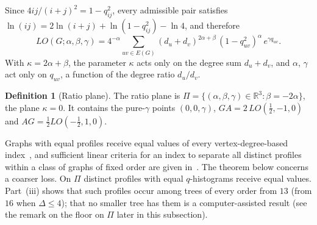 \documentclass[a5paper, 10pt]{article}
\theoremstyle{plain}
\theoremstyle{remark}
\theoremstyle{definition}
\newtheorem{definition}{Definition}
\begin{document}
  Since $4ij/(i+j)^2 = 1 - q_{ij}^2$, every admissible pair satisfies
  $\ln(ij) = 2\ln(i+j) + \ln(1 - q_{ij}^2) - \ln 4$, and therefore
  \begin{equation}\label{eq:factor}
  LO(G;\alpha,\beta,\gamma) = 4^{-\alpha} \sum_{uv \in E(G)}
  (d_u + d_v)^{2\alpha+\beta}\,(1 - q_{uv}^2)^{\alpha}\, e^{\gamma q_{uv}}.
  \end{equation}
  With $\kappa = 2\alpha + \beta$, the parameter $\kappa$ acts only on
  the degree sum $d_u + d_v$, and $\alpha$, $\gamma$ act only on
  $q_{uv}$, a function of the degree ratio $d_u/d_v$.

  \begin{definition}[Ratio plane]\label{def:ratioplane}
  The ratio plane is
  $\Pi = \{(\alpha,\beta,\gamma) \in \mathbb{R}^3 : \beta = -2\alpha\}$,
  the plane $\kappa = 0$. It contains the pure-$\gamma$ points
  $(0,0,\gamma)$, $GA = 2\,LO(\tfrac12,-1,0)$ and
  $AG = \tfrac12 LO(-\tfrac12,1,0)$.
  \end{definition}

  Graphs with equal profiles receive equal values of every
  vertex-degree-based index~\cite{Rada2019ExpVDB, Rada2026LinearVDB}, and
  sufficient linear criteria for an index to separate all distinct
  profiles within a class of graphs of fixed order are given
  in~\cite{RadaRodriguezSigarreta2022Weak, Rada2026LinearVDB}. The theorem below concerns a
  coarser loss. On $\Pi$ distinct profiles with equal $q$-histograms
  receive equal values. Part~(iii) shows that such profiles occur among
  trees of every order from $13$ (from $16$ when $\Delta \le 4$); that
  no smaller tree has them is a computer-assisted result (see the
  remark on the floor on $\Pi$ later in this subsection).
\end{document}
